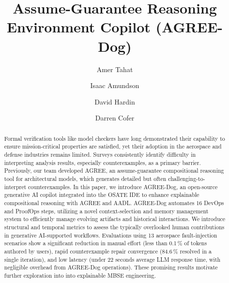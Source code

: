 \documentclass{llncs}
\begin{document}
%
\title{Assume-Guarantee Reasoning Environment Copilot (AGREE-Dog)}%
%
%
\author{Amer Tahat \and
  Isaac Amundson \and
  David Hardin \and
  Darren Cofer}
%
%
%

\maketitle

\begin{abstract}
Formal verification tools like model checkers have long demonstrated their capability to ensure mission-critical properties are satisfied, yet their adoption in the aerospace and defense industries remains limited. Surveys consistently identify difficulty in interpreting analysis results, especially counterexamples, as a primary barrier. Previously, our team developed AGREE, an assume-guarantee compositional reasoning tool for architectural models, which generates detailed but often challenging-to-interpret counterexamples.
%
In this paper, we introduce AGREE-Dog, an open-source generative AI copilot integrated into the OSATE IDE to enhance explainable compositional reasoning with AGREE and AADL. AGREE-Dog automates 16 DevOps and ProofOps steps, utilizing a novel context-selection and memory management system to efficiently manage evolving artifacts and historical interactions.
%
We introduce structural and temporal metrics to assess the typically overlooked human contributions in generative AI-supported workflows. Evaluations using 13 aerospace fault-injection scenarios show a significant reduction in manual effort (less than 0.1\,\% of tokens authored by users), rapid counterexample repair convergence (84.6\,\% resolved in a single iteration), and low latency (under 22 seconds average LLM response time, with negligible overhead from AGREE-Dog operations). %
These promising results motivate further exploration into into explainable MBSE engineering.
\end{abstract}
\end{document}
